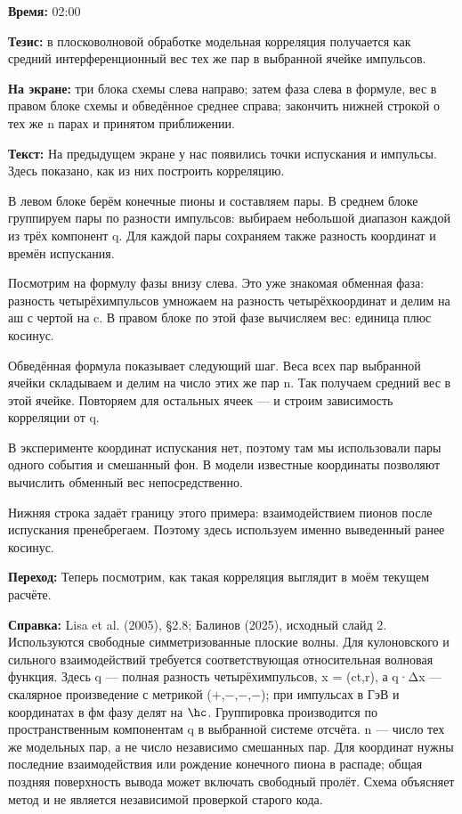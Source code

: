 \textbf{Время:} 02:00

\textbf{Тезис:} в плосковолновой обработке модельная корреляция получается как средний интерференционный вес тех же пар в выбранной ячейке импульсов.

\textbf{На экране:} три блока схемы слева направо; затем фаза слева в формуле, вес в правом блоке схемы и обведённое среднее справа; закончить нижней строкой о тех же n парах и принятом приближении.

\textbf{Текст:} На предыдущем экране у нас появились точки испускания и импульсы. Здесь показано, как из них построить корреляцию.

В левом блоке берём конечные пионы и составляем пары. В среднем блоке группируем пары по разности импульсов: выбираем небольшой диапазон каждой из трёх компонент q. Для каждой пары сохраняем также разность координат и времён испускания.

Посмотрим на формулу фазы внизу слева. Это уже знакомая обменная фаза: разность четырёхимпульсов умножаем на разность четырёхкоординат и делим на аш с чертой на c. В правом блоке по этой фазе вычисляем вес: единица плюс косинус.

Обведённая формула показывает следующий шаг. Веса всех пар выбранной ячейки складываем и делим на число этих же пар n. Так получаем средний вес в этой ячейке. Повторяем для остальных ячеек — и строим зависимость корреляции от q.

В эксперименте координат испускания нет, поэтому там мы использовали пары одного события и смешанный фон. В модели известные координаты позволяют вычислить обменный вес непосредственно.

Нижняя строка задаёт границу этого примера: взаимодействием пионов после испускания пренебрегаем. Поэтому здесь используем именно выведенный ранее косинус.

\textbf{Переход:} Теперь посмотрим, как такая корреляция выглядит в моём текущем расчёте.

\textbf{Справка:} Lisa et al. (2005), §2.8; Балинов (2025), исходный слайд 2. Используются свободные симметризованные плоские волны. Для кулоновского и сильного взаимодействий требуется соответствующая относительная волновая функция. Здесь q — полная разность четырёхимпульсов, x = (ct,r), а q·Δx — скалярное произведение с метрикой (+,−,−,−); при импульсах в ГэВ и координатах в фм фазу делят на \(\hc\). Группировка производится по пространственным компонентам q в выбранной системе отсчёта. n — число тех же модельных пар, а не число независимо смешанных пар. Для координат нужны последние взаимодействия или рождение конечного пиона в распаде; общая поздняя поверхность вывода может включать свободный пролёт. Схема объясняет метод и не является независимой проверкой старого кода.
